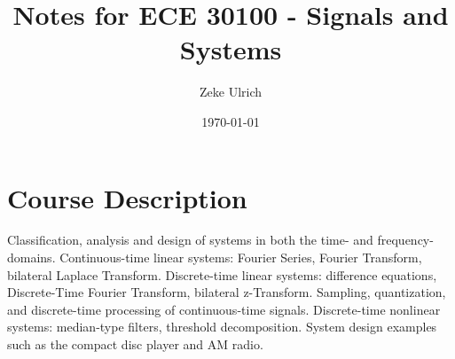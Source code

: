 \documentclass[nobib]{tufte-handout}
\title{Notes for ECE 30100 - Signals and Systems}
\author{Zeke Ulrich}
\date{\today}  %
\begin{document}
\maketitle

\tableofcontents

\section{Course Description}
Classification, analysis and design of systems in both the time- and frequency-domains.
Continuous-time linear systems: Fourier Series, Fourier Transform, bilateral Laplace
Transform. Discrete-time linear systems: difference equations, Discrete-Time Fourier
Transform, bilateral z-Transform. Sampling, quantization, and discrete-time processing
of continuous-time signals. Discrete-time nonlinear systems: median-type filters,
threshold decomposition. System design examples such as the compact disc player and AM radio.
\pagebreak







\end{document}
